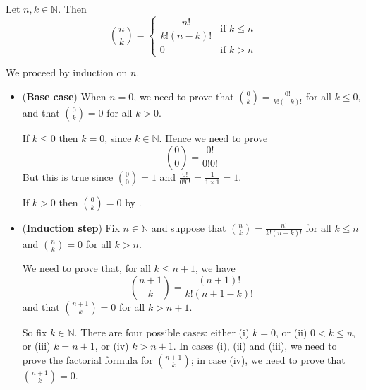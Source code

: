 \begin{theorem}
\label{thmBinomAsFactorialByInduction}
Let $n,k \in \mathbb{N}$. Then
\[ \binom{n}{k} =
\begin{cases}
\dfrac{n!}{k!(n-k)!} & \text{if } k \le n \\
0 & \text{if } k > n
\end{cases} \]
\end{theorem}
\begin{cproof}
We proceed by induction on $n$.
\begin{itemize}
\item (\textbf{Base case}) When $n=0$, we need to prove that $\binom{0}{k} = \frac{0!}{k!(-k)!}$ for all $k \le 0$, and that $\binom{0}{k} = 0$ for all $k>0$.

If $k \le 0$ then $k=0$, since $k \in \mathbb{N}$. Hence we need to prove
\[ \binom{0}{0} = \frac{0!}{0!0!} \]
But this is true since $\binom{0}{0}=1$ and $\frac{0!}{0!0!} = \frac{1}{1 \times 1} = 1$.

If $k>0$ then $\binom{0}{k} = 0$ by .
\item (\textbf{Induction step}) Fix $n \in \mathbb{N}$ and suppose that $\binom{n}{k} = \frac{n!}{k!(n-k)!}$ for all $k \le n$ and $\binom{n}{k} = 0$ for all $k > n$.

We need to prove that, for all $k \le n+1$, we have
\[ \binom{n+1}{k} = \frac{(n+1)!}{k!(n+1-k)!} \]
and that $\binom{n+1}{k} = 0$ for all $k > n+1$.

So fix $k \in \mathbb{N}$. There are four possible cases: either (i) $k=0$, or (ii) $0 < k \le n$, or (iii) $k=n+1$, or (iv) $k>n+1$. In cases (i), (ii) and (iii), we need to prove the factorial formula for $\binom{n+1}{k}$; in case (iv), we need to prove that $\binom{n+1}{k} = 0$.


\end{itemize}
\end{cproof}
